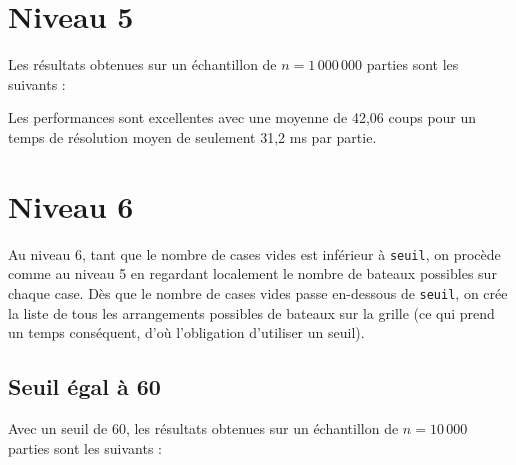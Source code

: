 \newpage
\section{Niveau 5}
Les résultats obtenues sur un échantillon de $n=1\,000\,000$ parties sont les suivants :

\begin{center}
\end{center}

Les performances sont excellentes avec une moyenne de 42,06 coups pour un temps de résolution moyen de seulement 31,2 ms par partie. 

\newpage
\section{Niveau 6}
Au niveau 6, tant que le nombre de cases vides est inférieur à \texttt{seuil}, on procède comme au niveau 5 en regardant localement le nombre de bateaux possibles sur chaque case. Dès que le nombre de cases vides passe en-dessous de \texttt{seuil}, on crée la liste de tous les arrangements possibles de bateaux sur la grille (ce qui prend un temps conséquent, d'où l'obligation d'utiliser un seuil).
\subsection{Seuil égal à 60}
Avec un seuil de 60, les résultats obtenues sur un échantillon de $n=10\,000$ parties sont les suivants :

